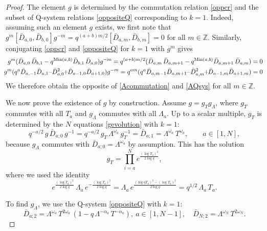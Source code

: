 \documentclass[12pt]{amsart}
\newcommand{\Z}{{\mathbb Z}}
\numberwithin{equation}{section}
\begin{document}
\begin{proof} The element $g$ is determined by the commutation relation \eqref{oppcr} and the subset of Q-system relations
\eqref{oppositeQ} corresponding to $k=1$. Indeed, assuming such  
an element $g$ exists, we first note that 
$g^m[{\bar D}_{a,0},{\bar D}_{b,0}]g^{-m}=q^{(a+b)m/2}[{\bar D}_{a,m},{\bar D}_{b,m}]=0$
for all $m\in \Z$. 
Similarly, conjugating \eqref{oppcr} and \eqref{oppositeQ} for $k=1$ with $g^m$ gives 
\begin{eqnarray*}&&\!\!\!\!\!\!g^m ({\bar D}_{a,0}\, {\bar D}_{b,1}-q^{{\rm Min}(a,b)} {\bar D}_{b,1}\,{\bar D}_{a,0})g^{-m}=
q^{(a+b)m/2}({\bar D}_{a,m}\, {\bar D}_{a,m+1}-q^{{\rm Min}(a,b)} {\bar D}_{a,m+1}\,{\bar D}_{a,m})=0\\
&&\!\!\!\!\!\!\!\!g^m ( q^a {\bar D}_{a,-1}{\bar D}_{a,1}\!\!-\!\!{\bar D}_{a,0}^2\!\!+\!\!{\bar D}_{a-1,0}{\bar D}_{a+1,0})g^{-m}=
q^{am} (q^a {\bar D}_{a,m-1}{\bar D}_{a,m+1}\!\!-\!\!{\bar D}_{a,m}^2\!\!+\!\!{\bar D}_{a-1,m}{\bar D}_{a+1,m})=0
\end{eqnarray*}
We therefore obtain the opposite of \eqref{Acommutation} and \eqref{AQsys} for all $m\in \Z$.

We now prove the existence of $g$ by construction.
Assume $g=g_T g_\Lambda$, where $g_T$ commutes with all $T_a$ and $g_\Lambda$ commutes with all $\Lambda_a$. Up to a scalar multiple, $g_T$ is  determined by the $N$ equations \eqref{gevolution} with $k=1$:
$$
q^{-a/2} \,g\,\bar  D_{a;0}\,g^{-1} = q^{-a/2} \,g_T \,\Lambda^{\omega_a} \,g_T^{-1} = \bar D_{a;1} =  \Lambda^{\omega_a} \,T^{\omega_a},\qquad a\in[1,N],
$$
because $g_\Lambda$ commutes with $\bar D_{a;0}=\Lambda^{\omega_a}$ by assumption.
This has the solution
\begin{equation}\label{gtvalue}
g_T =\prod_{i=a}^N e^{\frac{(\log T_a)^2}{2\log q}},
\end{equation}
where we used the identity
$$
e^{\frac{(\log T_a)^2}{2\log q}} \,\Lambda_a \,e^{-\frac{(\log T_a)^2}{2\log q}}  = \Lambda_a \,e^{\frac{(\log qT_a)^2-(\log T_a)^2}{2\log q}} = q^{1/2} \,\Lambda_a\, T_a.
$$

To find $g_\Lambda$, we use the Q-system \eqref{oppositeQ} with $k=1$:
\begin{equation}\label{Dtwoa}
\bar D_{a;2}= \Lambda^{\omega_a}\,T^{2\omega_a}\,(1-q \,\Lambda^{-\alpha_a}\,T^{-\alpha_a})  ,  \ a\in[1,N-1],\quad \bar D_{N;2}=\Lambda^{\omega_N}\,T^{2\omega_N}.
\end{equation}


\end{proof}
\end{document}
